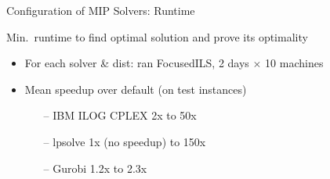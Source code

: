 \begin{frame}[c,fragile]{Configuration of MIP Solvers: Runtime}

\begin{block}{Min.\ runtime to find optimal solution and prove its optimality}
\begin{itemize}

        \smallskip
        \item For each solver \& dist: ran FocusedILS, 2 days $\times$ 10 machines

        
        \item Mean speedup over default (on test instances)
        \begin{itemize}
                \item[--] IBM ILOG CPLEX 2x to 50x
                \item[--] lpsolve 1x (no speedup) to 150x
                \item[--] Gurobi 1.2x to 2.3x
        \end{itemize}
        
\end{itemize}
\end{block}

\vspace*{-4mm}


\end{frame}
